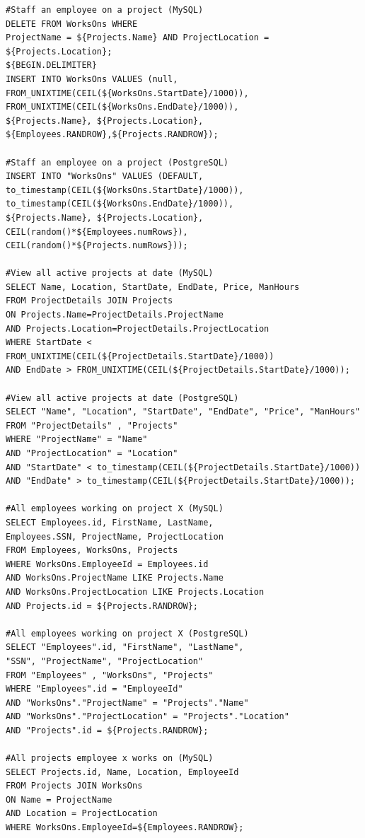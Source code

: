 \documentclass[12pt]{report}
\begin{document}
\begin{spacing}{1.9}
\begin{verbatim}
#Staff an employee on a project (MySQL)
DELETE FROM WorksOns WHERE 
ProjectName = ${Projects.Name} AND ProjectLocation = ${Projects.Location};
${BEGIN.DELIMITER}
INSERT INTO WorksOns VALUES (null,
FROM_UNIXTIME(CEIL(${WorksOns.StartDate}/1000)),
FROM_UNIXTIME(CEIL(${WorksOns.EndDate}/1000)),
${Projects.Name}, ${Projects.Location},
${Employees.RANDROW},${Projects.RANDROW});

#Staff an employee on a project (PostgreSQL)
INSERT INTO "WorksOns" VALUES (DEFAULT,
to_timestamp(CEIL(${WorksOns.StartDate}/1000)),
to_timestamp(CEIL(${WorksOns.EndDate}/1000)),
${Projects.Name}, ${Projects.Location},
CEIL(random()*${Employees.numRows}),
CEIL(random()*${Projects.numRows}));

#View all active projects at date (MySQL)
SELECT Name, Location, StartDate, EndDate, Price, ManHours 
FROM ProjectDetails JOIN Projects 
ON Projects.Name=ProjectDetails.ProjectName 
AND Projects.Location=ProjectDetails.ProjectLocation
WHERE StartDate < FROM_UNIXTIME(CEIL(${ProjectDetails.StartDate}/1000)) 
AND EndDate > FROM_UNIXTIME(CEIL(${ProjectDetails.StartDate}/1000));

#View all active projects at date (PostgreSQL)
SELECT "Name", "Location", "StartDate", "EndDate", "Price", "ManHours" 
FROM "ProjectDetails" , "Projects"
WHERE "ProjectName" = "Name" 
AND "ProjectLocation" = "Location"
AND "StartDate" < to_timestamp(CEIL(${ProjectDetails.StartDate}/1000))
AND "EndDate" > to_timestamp(CEIL(${ProjectDetails.StartDate}/1000));

#All employees working on project X (MySQL)
SELECT Employees.id, FirstName, LastName, 
Employees.SSN, ProjectName, ProjectLocation 
FROM Employees, WorksOns, Projects 
WHERE WorksOns.EmployeeId = Employees.id 
AND WorksOns.ProjectName LIKE Projects.Name 
AND WorksOns.ProjectLocation LIKE Projects.Location
AND Projects.id = ${Projects.RANDROW};

#All employees working on project X (PostgreSQL)
SELECT "Employees".id, "FirstName", "LastName", 
"SSN", "ProjectName", "ProjectLocation"
FROM "Employees" , "WorksOns", "Projects"
WHERE "Employees".id = "EmployeeId"
AND "WorksOns"."ProjectName" = "Projects"."Name"
AND "WorksOns"."ProjectLocation" = "Projects"."Location"
AND "Projects".id = ${Projects.RANDROW};

#All projects employee x works on (MySQL)
SELECT Projects.id, Name, Location, EmployeeId 
FROM Projects JOIN WorksOns 
ON Name = ProjectName 
AND Location = ProjectLocation
WHERE WorksOns.EmployeeId=${Employees.RANDROW};


\end{verbatim}
\end{spacing}
\end{document}
